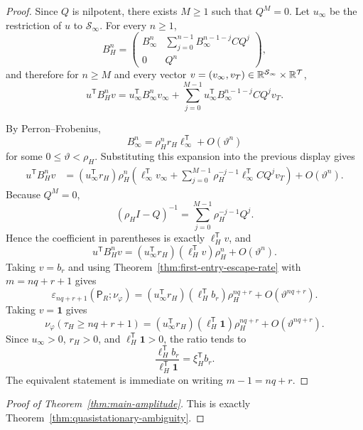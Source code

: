 \begin{proof}
Since \(Q\) is nilpotent, there exists \(M\geq 1\) such that \(Q^M=0\).
Let \(u_\infty\) be the restriction of \(u\) to \(\mathcal S_\infty\).
For every \(n\geq 1\),
\[
  B_H^n=
  \begin{pmatrix}
    B_\infty^n &
    \sum_{j=0}^{n-1}B_\infty^{n-1-j}CQ^j\\
    0 & Q^n
  \end{pmatrix},
\]
and therefore for \(n\geq M\) and every vector
\(v=(v_\infty,v_T)\in\mathbb{R}^{\mathcal S_\infty}\times\mathbb{R}^{\mathcal T}\),
\[
  u^{\mathsf T}B_H^n v
  =
  u_\infty^{\mathsf T}B_\infty^n v_\infty
  + \sum_{j=0}^{M-1}
      u_\infty^{\mathsf T}B_\infty^{n-1-j}CQ^j v_T.
\]

By Perron--Frobenius,
\[
  B_\infty^n
  = \rho_H^n r_H\ell_\infty^{\mathsf T}+O(\vartheta^n)
\]
for some \(0\leq \vartheta<\rho_H\).  Substituting this expansion into
the previous display gives
\begin{align*}
  u^{\mathsf T}B_H^n v
  &=
    (u_\infty^{\mathsf T}r_H)\rho_H^n
    \left(
      \ell_\infty^{\mathsf T}v_\infty
      + \sum_{j=0}^{M-1}
          \rho_H^{-j-1}\ell_\infty^{\mathsf T}CQ^j v_T
    \right)
    + O(\vartheta^n).
\end{align*}
Because \(Q^M=0\),
\[
  (\rho_H I-Q)^{-1}
  = \sum_{j=0}^{M-1}\rho_H^{-j-1}Q^j.
\]
Hence the coefficient in parentheses is exactly \(\ell_H^{\mathsf T}v\),
and
\[
  u^{\mathsf T}B_H^n v
  =
  (u_\infty^{\mathsf T}r_H)(\ell_H^{\mathsf T}v)\rho_H^n
  + O(\vartheta^n).
\]
Taking \(v=b_r\) and using
Theorem~\ref{thm:first-entry-escape-rate} with \(m=nq+r+1\) gives
\[
  \varepsilon_{nq+r+1}(\mathsf P_R;\nu_\varphi)
  =
  (u_\infty^{\mathsf T}r_H)(\ell_H^{\mathsf T}b_r)\rho_H^{nq+r}
  + O(\vartheta^{nq+r}).
\]
Taking \(v=\mathbf 1\) gives
\[
  \nu_\varphi(\tau_H\ge nq+r+1)
  =
  (u_\infty^{\mathsf T}r_H)(\ell_H^{\mathsf T}\mathbf 1)\rho_H^{nq+r}
  + O(\vartheta^{nq+r}).
\]
Since \(u_\infty>0\), \(r_H>0\), and \(\ell_H^{\mathsf T}\mathbf 1>0\),
the ratio tends to
\[
  \frac{\ell_H^{\mathsf T}b_r}{\ell_H^{\mathsf T}\mathbf 1}
  = \xi_H^{\mathsf T}b_r.
\]
The equivalent statement is immediate on writing \(m-1=nq+r\).
\end{proof}

\begin{proof}[Proof of Theorem~\ref{thm:main-amplitude}]
This is exactly Theorem~\ref{thm:quasistationary-ambiguity}.
\end{proof}


